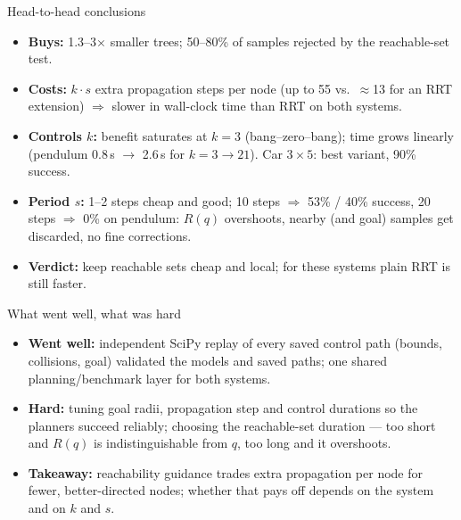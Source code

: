 \documentclass[aspectratio=169,10pt]{beamer}
\begin{document}
\begin{frame}{Head-to-head conclusions}
\begin{itemize}
\item \textbf{Buys:} 1.3--3$\times$ smaller trees; 50--80\% of samples rejected by the reachable-set test.
\item \textbf{Costs:} $k\cdot s$ extra propagation steps per node (up to 55 vs.\ $\approx$13 for an RRT extension) $\Rightarrow$ slower in
      wall-clock time than RRT on both systems.
\item \textbf{Controls $k$:} benefit saturates at $k=3$ (bang--zero--bang); time grows linearly (pendulum 0.8\,s $\to$ 2.6\,s for
      $k=3\to21$). Car $3\times5$: best variant, 90\% success.
\item \textbf{Period $s$:} 1--2 steps cheap and good; 10 steps $\Rightarrow$ 53\% / 40\% success, 20 steps $\Rightarrow$ 0\% on pendulum:
      $R(q)$ overshoots, nearby (and goal) samples get discarded, no fine corrections.
\item \textbf{Verdict:} keep reachable sets cheap and local; for these systems plain RRT is still faster.
\end{itemize}
\end{frame}

\begin{frame}{What went well, what was hard}
\begin{itemize}
\item \textbf{Went well:} independent SciPy replay of every saved control path (bounds, collisions, goal) validated the models and saved paths; one shared planning/benchmark layer for both systems.
\item \textbf{Hard:} tuning goal radii, propagation step and control durations so the planners succeed reliably;
      choosing the reachable-set duration --- too short and $R(q)$ is indistinguishable from $q$, too long and it overshoots.
\item \textbf{Takeaway:} reachability guidance trades extra propagation per node for fewer, better-directed nodes; whether that
      pays off depends on the system and on $k$ and $s$.
\end{itemize}
\end{frame}
\end{document}
